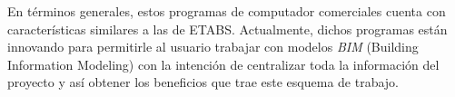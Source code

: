En términos generales, estos programas de computador comerciales cuenta con características similares a las de ETABS. Actualmente, dichos programas están innovando para permitirle al usuario trabajar con modelos \emph{BIM} (Building Information Modeling) con la intención de centralizar toda la información del proyecto y así obtener los beneficios que trae este esquema de trabajo.\\







